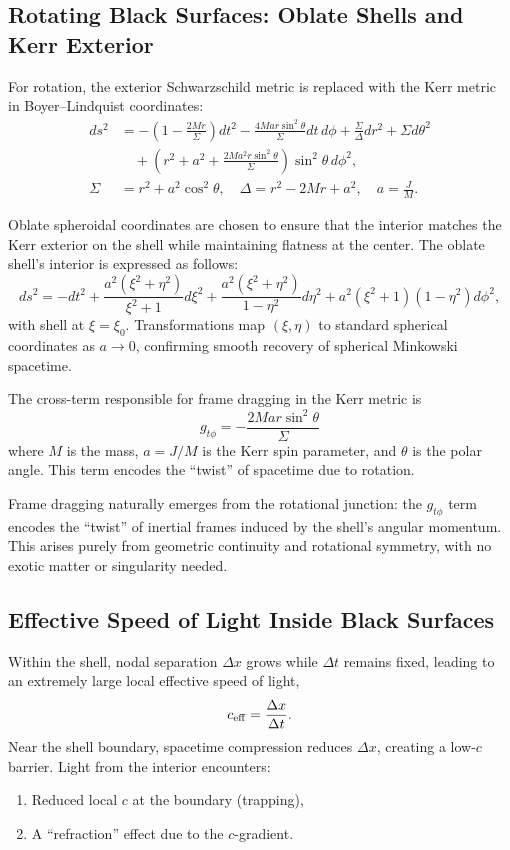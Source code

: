 \documentclass[12pt]{article}
\begin{document}
\subsection{Rotating Black Surfaces: Oblate Shells and Kerr Exterior}

For rotation, the exterior Schwarzschild metric is replaced with the Kerr metric in Boyer--Lindquist coordinates:
\begin{align*}
ds^2 &= -\left(1 - \frac{2Mr}{\Sigma}\right) dt^2 - \frac{4Mar\sin^2\theta}{\Sigma} dt\, d\phi + \frac{\Sigma}{\Delta} dr^2 + \Sigma d\theta^2 \\
&\quad + \left(r^2 + a^2 + \frac{2Ma^2 r \sin^2\theta}{\Sigma} \right) \sin^2\theta\, d\phi^2,\\
\Sigma &= r^2 + a^2 \cos^2\theta, \quad \Delta = r^2 - 2Mr + a^2, \quad a = \frac{J}{M}.
\end{align*}

Oblate spheroidal coordinates are chosen to ensure that the interior matches the Kerr exterior on the shell while maintaining flatness at the center.  The oblate shell's interior is expressed as follows:
\[
ds^2 = -dt^2 + \frac{a^2(\xi^2 + \eta^2)}{\xi^2 + 1} d\xi^2 + \frac{a^2(\xi^2 + \eta^2)}{1 - \eta^2} d\eta^2 + a^2 (\xi^2 + 1)(1 - \eta^2) d\phi^2,
\]
with shell at \(\xi = \xi_0\). Transformations map \((\xi,\eta)\) to standard spherical coordinates as \(a \to 0\), confirming smooth recovery of spherical Minkowski spacetime.

The cross-term responsible for frame dragging in the Kerr metric is
\begin{equation}
g_{t\phi} = - \frac{2 M a r \sin^2\theta}{\Sigma}
\end{equation}
where $M$ is the mass, $a = J/M$ is the Kerr spin parameter, and $\theta$ is the polar angle. This term encodes the “twist” of spacetime due to rotation.

Frame dragging naturally emerges from the rotational junction: the \(g_{t\phi}\) term encodes the “twist” of inertial frames induced by the shell's angular momentum. This arises purely from geometric continuity and rotational symmetry, with no exotic matter or singularity needed.

\subsection{Effective Speed of Light Inside Black Surfaces}

Within the shell, nodal separation \(\Delta x\) grows while \(\Delta t\) remains fixed, leading to an extremely large local effective speed of light,
\[
c_{\rm eff} = \frac{\Delta x}{\Delta t}.
\]
Near the shell boundary, spacetime compression reduces \(\Delta x\), creating a low-\(c\) barrier. Light from the interior encounters:
\begin{enumerate}
    \item Reduced local \(c\) at the boundary (trapping),
    \item A “refraction” effect due to the \(c\)-gradient.
\end{enumerate}
\end{document}
